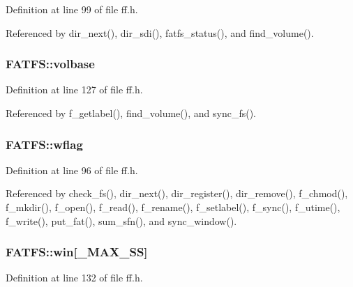 Definition at line 99 of file ff.\+h.



Referenced by dir\+\_\+next(), dir\+\_\+sdi(), fatfs\+\_\+status(), and find\+\_\+volume().

\subsubsection[{\texorpdfstring{volbase}{volbase}}]{ F\+A\+T\+F\+S\+::volbase}\hypertarget{structFATFS_a8f0ca578755749d204f59dc83f1a7649}{}\label{structFATFS_a8f0ca578755749d204f59dc83f1a7649}


Definition at line 127 of file ff.\+h.



Referenced by f\+\_\+getlabel(), find\+\_\+volume(), and sync\+\_\+fs().

\subsubsection[{\texorpdfstring{wflag}{wflag}}]{ F\+A\+T\+F\+S\+::wflag}\hypertarget{structFATFS_a647e43c9ccae94b7274793d1909897de}{}\label{structFATFS_a647e43c9ccae94b7274793d1909897de}


Definition at line 96 of file ff.\+h.



Referenced by check\+\_\+fs(), dir\+\_\+next(), dir\+\_\+register(), dir\+\_\+remove(), f\+\_\+chmod(), f\+\_\+mkdir(), f\+\_\+open(), f\+\_\+read(), f\+\_\+rename(), f\+\_\+setlabel(), f\+\_\+sync(), f\+\_\+utime(), f\+\_\+write(), put\+\_\+fat(), sum\+\_\+sfn(), and sync\+\_\+window().

\subsubsection[{\texorpdfstring{win}{win}}]{ F\+A\+T\+F\+S\+::win\mbox{[}{\bf \+\_\+\+M\+A\+X\+\_\+\+SS}\mbox{]}}\hypertarget{structFATFS_a7cc35a593465e727ab87723c14610644}{}\label{structFATFS_a7cc35a593465e727ab87723c14610644}


Definition at line 132 of file ff.\+h.



